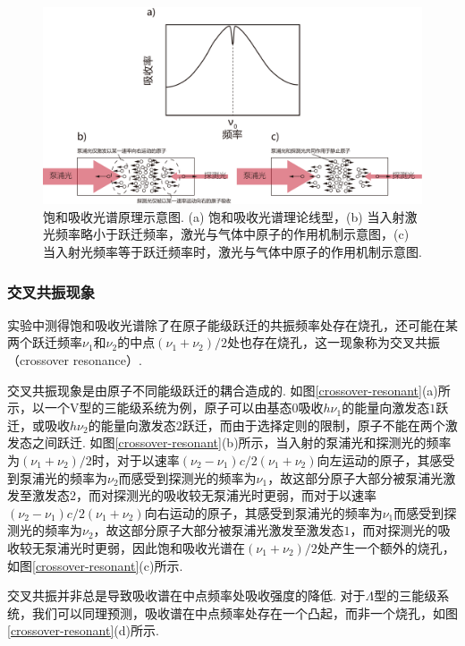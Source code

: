 \documentclass[a4paper, 10pt]{article}
\begin{document}
\begin{multicols*}{2}
\begin{figure}[H]
    \centering
    \includegraphics[width=.95\columnwidth]{SaturatedAbsorption.pdf}
    \caption{饱和吸收光谱原理示意图. (a) 饱和吸收光谱理论线型，(b) 当入射激光频率略小于跃迁频率，激光与气体中原子的作用机制示意图，(c) 当入射光频率等于跃迁频率时，激光与气体中原子的作用机制示意图.}
    \label{saturated-absorption}
\end{figure}

\subsubsection{交叉共振现象}
实验中测得饱和吸收光谱除了在原子能级跃迁的共振频率处存在烧孔，还可能在某两个跃迁频率$\nu_1$和$\nu_2$的中点$(\nu_1+\nu_2)/2$处也存在烧孔，这一现象称为交叉共振（crossover resonance）.

交叉共振现象是由原子不同能级跃迁的耦合造成的. 如图\ref{crossover-resonant}(a)所示，以一个V型的三能级系统为例，原子可以由基态$0$吸收$h\nu_1$的能量向激发态$1$跃迁，或吸收$h\nu_2$的能量向激发态$2$跃迁，而由于选择定则的限制，原子不能在两个激发态之间跃迁. 如图\ref{crossover-resonant}(b)所示，当入射的泵浦光和探测光的频率为$(\nu_1+\nu_2)/2$时，对于以速率$(\nu_2-\nu_1)c/2(\nu_1+\nu_2)$向左运动的原子，其感受到泵浦光的频率为$\nu_2$而感受到探测光的频率为$\nu_1$，故这部分原子大部分被泵浦光激发至激发态$2$，而对探测光的吸收较无泵浦光时更弱，而对于以速率$(\nu_2-\nu_1)c/2(\nu_1+\nu_2)$向右运动的原子，其感受到泵浦光的频率为$\nu_1$而感受到探测光的频率为$\nu_2$，故这部分原子大部分被泵浦光激发至激发态$1$，而对探测光的吸收较无泵浦光时更弱，因此饱和吸收光谱在$(\nu_1+\nu_2)/2$处产生一个额外的烧孔，如图\ref{crossover-resonant}(c)所示.

交叉共振并非总是导致吸收谱在中点频率处吸收强度的降低. 对于$\Lambda$型的三能级系统，我们可以同理预测，吸收谱在中点频率处存在一个凸起，而非一个烧孔，如图\ref{crossover-resonant}(d)所示.


\end{multicols*}
\end{document}
